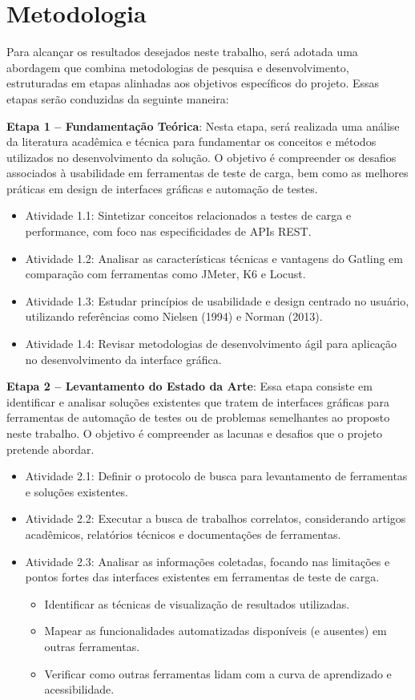 \documentclass[
	12pt,
	openright,
	twoside,
	a4paper,
	english,
	brazil
	]{abntex2}
\begin{document}
\section{Metodologia}

Para alcançar os resultados desejados neste trabalho, será adotada uma abordagem que combina metodologias de pesquisa e desenvolvimento, estruturadas em etapas alinhadas aos objetivos específicos do projeto. Essas etapas serão conduzidas da seguinte maneira:

\textbf{Etapa 1 -- Fundamentação Teórica}: Nesta etapa, será realizada uma análise da literatura acadêmica e técnica para fundamentar os conceitos e métodos utilizados no desenvolvimento da solução. O objetivo é compreender os desafios associados à usabilidade em ferramentas de teste de carga, bem como as melhores práticas em design de interfaces gráficas e automação de testes.

\begin{itemize}
  \item[] Atividade 1.1: Sintetizar conceitos relacionados a testes de carga e performance, com foco nas especificidades de APIs REST.
  \item[] Atividade 1.2: Analisar as características técnicas e vantagens do Gatling em comparação com ferramentas como JMeter, K6 e Locust.
  \item[] Atividade 1.3: Estudar princípios de usabilidade e design centrado no usuário, utilizando referências como Nielsen (1994) e Norman (2013).
  \item[] Atividade 1.4: Revisar metodologias de desenvolvimento ágil para aplicação no desenvolvimento da interface gráfica.
\end{itemize}


\textbf{Etapa 2 -- Levantamento do Estado da Arte}: Essa etapa consiste em identificar e analisar soluções existentes que tratem de interfaces gráficas para ferramentas de automação de testes ou de problemas semelhantes ao proposto neste trabalho. O objetivo é compreender as lacunas e desafios que o projeto pretende abordar.

\begin{itemize}
  \item[] Atividade 2.1: Definir o protocolo de busca para levantamento de ferramentas e soluções existentes.
  \item[] Atividade 2.2: Executar a busca de trabalhos correlatos, considerando artigos acadêmicos, relatórios técnicos e documentações de ferramentas.
  \item[] Atividade 2.3: Analisar as informações coletadas, focando nas limitações e pontos fortes das interfaces existentes em ferramentas de teste de carga.
    \begin{itemize}
      \item Identificar as técnicas de visualização de resultados utilizadas.
      \item Mapear as funcionalidades automatizadas disponíveis (e ausentes) em outras ferramentas.
      \item Verificar como outras ferramentas lidam com a curva de aprendizado e acessibilidade.
    \end{itemize}
\end{itemize}
\end{document}
